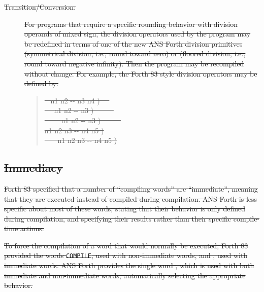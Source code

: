 \begin{description}
\item[\sout{Transition/Conversion:}]
\sout{%
	For programs that require a specific rounding behavior with division
	operands of mixed sign, the division operators used by the program
	may be redefined in terms of one of the new ANS Forth division
	primitives  (symmetrical division, i.e., round toward
	zero) or  (floored division, i.e., round toward
	negative infinity). Then the program may be recompiled without
	change. For example, the Forth 83 style division operators may be
	defined by:}
	\begin{quote}\ttfamily
		\sout{\word{:} ~  n1 n2 -{}- n3 n4 ) ~~
			    \word{;}} \\
		\sout{\word{:} ~~  n1 n2 -{}- n3 ) ~~~~~
			   \word{;}} \\
		\sout{\word{:} \word{/}~~~~  n1 n2 -{}- n3 ) ~~~~~
			    \word{;}} \\
		\sout{\word{:}   n1 n2 n3 -{}- n4 n5 )
			    \word{;}} \\
		\sout{\word{:} \word{*/}~~~  n1 n2 n3 -{}- n4 n5 )
			    \word{;}} \\
	\end{quote}
\end{description}


\subsection[Immediacy]{\sout{Immediacy}} %
\label{diff:immediate}

\sout{%
Forth 83 specified that a number of ``compiling words'' are
``immediate'', meaning that they are executed instead of compiled
during compilation. ANS Forth is less specific about most of these
words, stating that their behavior is only defined during compilation,
and specifying their results rather than their specific compile-time
actions.}

\sout{%
To force the compilation of a word that would normally be executed,
Forth 83 provided the words \linebreak \texttt{COMPILE}, used with non-immediate
words, and \word{[COMPILE]}, used with immediate words. ANS Forth
provides the single word , which is used with both
immediate and non-immediate words, automatically selecting the
appropriate behavior.}

